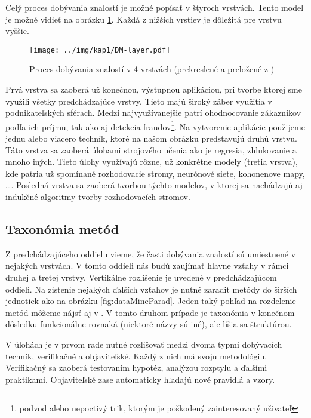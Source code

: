 Celý proces dobývania znalostí je možné popísať v štyroch vrstvách. Tento model je možné vidieť na obrázku \ref{fig:layerModel}. Každá z nižších vrstiev je dôležitá pre vrstvu vyššie.

\begin{figure}[h]
\centering
\centerline{\mbox{\texttt{[image: ../img/kap1/DM-layer.pdf]}}}
\caption{Proces dobývania znalostí v 4 vrstvách (prekreslené a preložené z \cite[s. 26]{kap1-DataMiningForTrees})}\label{fig:layerModel}
\end{figure}

Prvá vrstva sa zaoberá už konečnou, výstupnou aplikáciou, pri tvorbe ktorej sme využili všetky predchádzajúce vrstvy. Tieto majú široký záber využitia v podnikateľských sférach. Medzi najvyužívanejšie patrí ohodnocovanie zákazníkov podľa ich príjmu, tak ako aj detekcia fraudov\footnote{podvod alebo nepoctivý trik, ktorým je poškodený zainteresovaný uživateľ}. Na vytvorenie aplikácie použijeme jednu alebo viacero techník, ktoré na našom obrázku predstavujú druhú vrstvu. Táto vrstva sa zaoberá úlohami strojového učenia ako je regresia, zhlukovanie a mnoho iných. Tieto úlohy využívajú rôzne, už konkrétne modely (tretia vrstva), kde patria už spomínané rozhodovacie stromy, neurónové siete, kohonenove mapy, \ldots. Posledná vrstva sa zaoberá tvorbou týchto modelov, v ktorej sa nachádzajú aj indukčné algoritmy tvorby rozhodovacích stromov.


\subsection{Taxonómia metód}\label{kap1:2.2:2.2.3:Taxonomy}
Z predchádzajúceho oddielu vieme, že časti dobývania znalostí sú umiestnené v nejakých vrstvách. V tomto oddieli nás budú zaujímať hlavne vzťahy v rámci druhej a tretej vrstvy. Vertikálne rozlíšenie je uvedené v predchádzajúcom oddieli. Na zistenie nejakých ďalších vzťahov je nutné zaradiť metódy do širších jednotiek ako na obrázku \ref{fig:dataMineParad}. Jeden taký pohľad na rozdelenie metód môžeme nájsť aj v \cite{online-DataMining}. V tomto druhom prípade je taxonómia v konečnom dôsledku funkcionálne rovnaká (niektoré názvy sú iné), ale líšia sa štruktúrou. 

V úlohách je v prvom rade nutné rozlišovať medzi dvoma typmi dobývacích techník, verifikačné a objaviteľské. Každý z nich má svoju metodológiu. Verifikačný sa zaoberá testovaním hypotéz, analýzou rozptylu a ďalšími praktikami. Objaviteľské zase automaticky hľadajú nové pravidlá a vzory.

